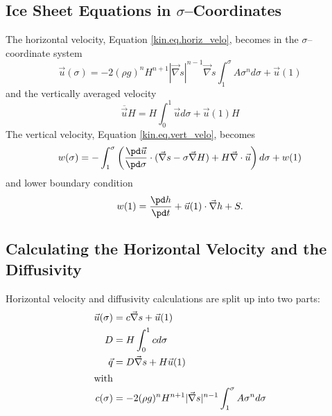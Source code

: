 \subsection{Ice Sheet Equations in $\sigma$--Coordinates}
The horizontal velocity, Equation \eqref{kin.eq.horiz_velo}, becomes in the $\sigma$--coordinate system
\begin{equation}
  \label{kin.eq.vert_velo_sigma}
  \vec u(\sigma) = -2(\rho g)^nH^{n+1}|\vec\nabla s|^{n-1}\vec\nabla s\int_1^\sigma A\sigma^nd\sigma+\vec u(1)
\end{equation}
and the vertically averaged velocity
\begin{equation}
  \label{kin.eq.avg_velo_scaled}
  \overline{\vec u} H=H\int_0^1\vec ud\sigma+\vec u(1)H
\end{equation}
The vertical velocity, Equation \eqref{kin.eq.vert_velo}, becomes
\begin{equation}
  \label{kin.eq.vert_velo_scaled}
  w(\sigma)=-\int_1^\sigma\left(\frac{\pd\vec u}{\pd\sigma}\cdot(\vec\nabla s-\sigma\vec\nabla H)+H\vec\nabla\cdot\vec u\right)d\sigma+w(1)
\end{equation}
and lower boundary condition
\begin{equation}
  w(1)=\frac{\pd h}{\pd t}+\vec u(1)\cdot\vec\nabla h+S.
\end{equation}

\subsection{Calculating the Horizontal Velocity and the Diffusivity}
Horizontal velocity and diffusivity calculations are split up into two parts:
\begin{subequations}
  \begin{align}
    \vec u(\sigma)&=c\vec\nabla s+\vec u(1)\\
    D &=H\int_0^1cd\sigma\\
    \vec q&=D\vec\nabla s+H\vec u(1)\\
    \intertext{with}
    c(\sigma)&=-2(\rho g)^nH^{n+1}|\vec\nabla s|^{n-1}\int_1^\sigma A\sigma^nd\sigma
  \end{align}
\end{subequations}


